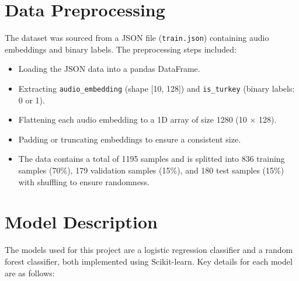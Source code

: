 \documentclass[12pt, a4paper]{article}
\begin{document}
\section{Data Preprocessing}
The dataset was sourced from a JSON file (\texttt{train.json}) containing audio embeddings and binary labels. The preprocessing steps included:

\begin{itemize}
    \item Loading the JSON data into a pandas DataFrame.
    \item Extracting \texttt{audio\_embedding} (shape [10, 128]) and \texttt{is\_turkey} (binary labels: 0 or 1).
    \item Flattening each audio embedding to a 1D array of size 1280 (10 $\times$ 128).
    \item Padding or truncating embeddings to ensure a consistent size.
    \item The data contains a total of 1195 samples and is splitted into 836 training samples (70\%), 179 validation samples (15\%), and 180 test samples (15\%) with shuffling to ensure randomness.
\end{itemize}

\section{Model Description}
The models used for this project are a logistic regression classifier and a random forest classifier, both implemented using Scikit-learn. Key details for each model are as follows:
\end{document}
